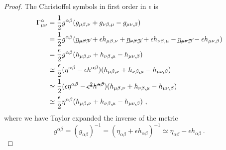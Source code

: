     \begin{proof}
        The Christoffel symbols in first order in $\epsilon$ is 
        \begin{equation*}
        \begin{aligned}
            \Gamma^\alpha_{\mu\nu} & = \frac{1}{2} g^{\alpha\beta} (g_{\mu\beta, \nu} + g_{\nu\beta,\mu} - g_{\mu\nu,\beta}) \\ & = \frac{1}{2} g^{\alpha\beta} (\cancel{\eta_{\mu\beta, \nu}} + \epsilon h_{\mu\beta, \nu} + \cancel{\eta_{\nu\beta,\mu}} + \epsilon h_{\nu\beta,\mu} - \cancel{\eta_{\mu\nu,\beta} }- \epsilon h_{\mu\nu,\beta} ) \\ & = \frac{\epsilon}{2} g^{\alpha\beta} (h_{\mu\beta, \nu} + h_{\nu\beta,\mu} - h_{\mu\nu,\beta}) \\ & \simeq \frac{\epsilon}{2} (\eta^{\alpha\beta} - \epsilon h^{\alpha\beta}) (h_{\mu\beta, \nu} + h_{\nu\beta,\mu} - h_{\mu\nu,\beta}) \\ & \simeq \frac{1}{2} (\epsilon \eta^{\alpha\beta} - \cancel{\epsilon^2 h^{\alpha\beta}}) (h_{\mu\beta, \nu} + h_{\nu\beta,\mu} - h_{\mu\nu,\beta}) \\ & \simeq \frac{\epsilon}{2} \eta^{\alpha\beta} (h_{\mu\beta, \nu} + h_{\nu\beta,\mu} - h_{\mu\nu,\beta}) ~,
        \end{aligned}
        \end{equation*}
        where we have Taylor expanded the inverse of the metric 
        \begin{equation*}
            g^{\alpha\beta} = (g_{\alpha\beta})^{-1} = (\eta_{\alpha\beta} + \epsilon h_{\alpha\beta})^{-1} \simeq \eta_{\alpha\beta} - \epsilon h_{\alpha\beta}  ~.
        \end{equation*}


\end{proof}

